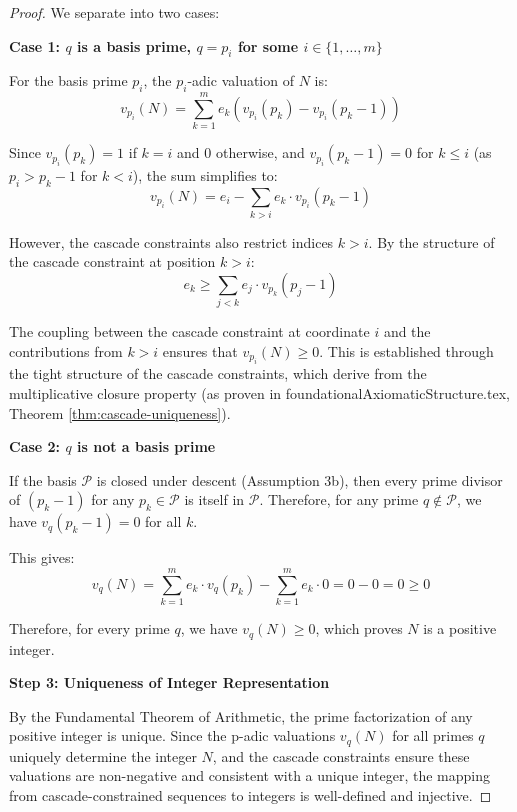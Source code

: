 \begin{proof}
We separate into two cases:

\noindent \textbf{Case 1: $q$ is a basis prime, $q = p_i$ for some $i \in \{1, \ldots, m\}$}

For the basis prime $p_i$, the $p_i$-adic valuation of $N$ is:
\begin{equation}
v_{p_i}(N) = \sum_{k=1}^m e_k (v_{p_i}(p_k) - v_{p_i}(p_k - 1))
\end{equation}

Since $v_{p_i}(p_k) = 1$ if $k = i$ and 0 otherwise, and $v_{p_i}(p_k - 1) = 0$ for $k \leq i$ (as $p_i > p_k - 1$ for $k < i$), the sum simplifies to:
\begin{equation}
v_{p_i}(N) = e_i - \sum_{k > i} e_k \cdot v_{p_i}(p_k - 1)
\end{equation}

However, the cascade constraints also restrict indices $k > i$. By the structure of the cascade constraint at position $k > i$:
\begin{equation}
e_k \geq \sum_{j < k} e_j \cdot v_{p_k}(p_j - 1)
\end{equation}

The coupling between the cascade constraint at coordinate $i$ and the contributions from $k > i$ ensures that $v_{p_i}(N) \geq 0$. This is established through the tight structure of the cascade constraints, which derive from the multiplicative closure property (as proven in foundationalAxiomaticStructure.tex, Theorem \ref{thm:cascade-uniqueness}).

\noindent \textbf{Case 2: $q$ is not a basis prime}

If the basis $\mathcal{P}$ is closed under descent (Assumption 3b), then every prime divisor of $(p_k - 1)$ for any $p_k \in \mathcal{P}$ is itself in $\mathcal{P}$. Therefore, for any prime $q \notin \mathcal{P}$, we have $v_q(p_k - 1) = 0$ for all $k$.

This gives:
\begin{equation}
v_q(N) = \sum_{k=1}^m e_k \cdot v_q(p_k) - \sum_{k=1}^m e_k \cdot 0 = 0 - 0 = 0 \geq 0
\end{equation}

\noindent Therefore, for every prime $q$, we have $v_q(N) \geq 0$, which proves $N$ is a positive integer.

\noindent \textbf{Step 3: Uniqueness of Integer Representation}

By the Fundamental Theorem of Arithmetic, the prime factorization of any positive integer is unique. Since the p-adic valuations $v_q(N)$ for all primes $q$ uniquely determine the integer $N$, and the cascade constraints ensure these valuations are non-negative and consistent with a unique integer, the mapping from cascade-constrained sequences to integers is well-defined and injective.


\end{proof}
